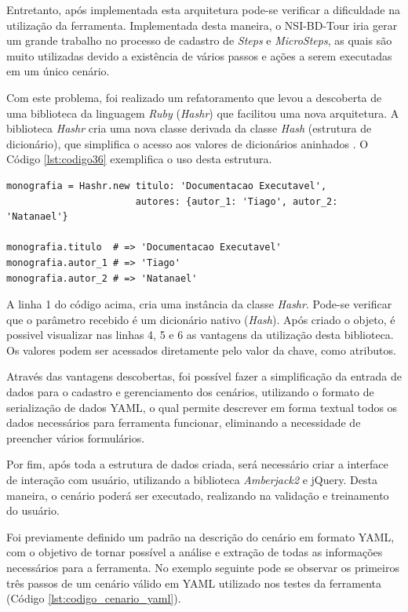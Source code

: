 Entretanto, após implementada esta arquitetura pode-se verificar a dificuldade na utilização da ferramenta. Implementada desta maneira, o NSI-BD-Tour iria gerar um grande trabalho no processo de cadastro de \textit{Steps} e \textit{MicroSteps}, as quais são muito utilizadas devido a existência de vários passos e ações a serem executadas em um único cenário.

Com este problema, foi realizado um refatoramento que levou a descoberta de uma biblioteca da linguagem \textit{Ruby} (\textit{Hashr}) que facilitou uma nova arquitetura. A biblioteca \textit{Hashr} cria uma nova classe derivada da classe \textit{Hash} (estrutura de dicionário), que simplifica o acesso aos valores de dicionários aninhados \cite{HASHR}. O Código \ref{lst:codigo36} exemplifica o uso desta estrutura.

{\singlespace
\begin{lstlisting}[caption=Exemplo de uso da estrutura \textit{Hashr},label={lst:codigo36}]
monografia = Hashr.new titulo: 'Documentacao Executavel',
                       autores: {autor_1: 'Tiago', autor_2: 'Natanael'}

monografia.titulo  # => 'Documentacao Executavel'
monografia.autor_1 # => 'Tiago'
monografia.autor_2 # => 'Natanael'

\end{lstlisting}
}

A linha 1 do código acima, cria uma instância da classe \textit{Hashr}. Pode-se verificar que o parâmetro recebido é um dicionário nativo (\textit{Hash}). Após criado o objeto, é possivel visualizar nas linhas 4, 5 e 6 as vantagens da utilização desta biblioteca. Os valores podem ser acessados diretamente pelo valor da chave, como atributos.

Através das vantagens descobertas, foi possível fazer a simplificação da entrada de dados para o cadastro e gerenciamento dos cenários, utilizando o formato de serialização de dados YAML, o qual permite descrever em forma textual todos os dados necessários para ferramenta funcionar, eliminando a necessidade de preencher vários formulários.

Por fim, após toda a estrutura de dados criada, será necessário criar a interface de interação com usuário, utilizando a biblioteca \textit{Amberjack2} e jQuery. Desta maneira, o cenário poderá ser executado, realizando na validação e treinamento do usuário.

Foi previamente definido um padrão na descrição do cenário em formato YAML, com o objetivo de tornar possível a análise e extração de todas as informações necessários para a ferramenta. No exemplo seguinte pode se observar os primeiros três passos de um cenário válido em YAML utilizado nos testes da ferramenta (Código \ref{lst:codigo_cenario_yaml}).

